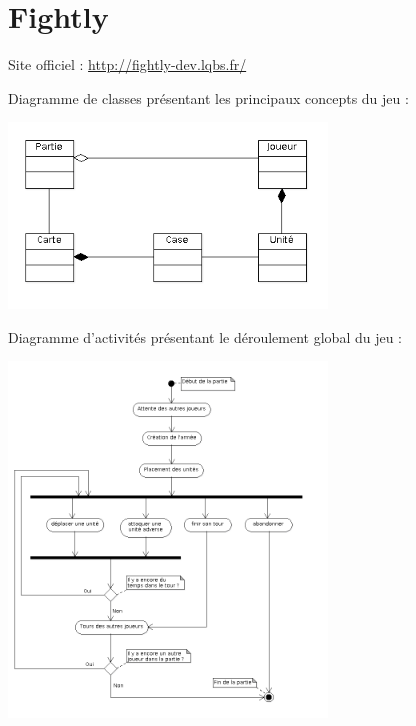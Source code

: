 \documentclass[a4paper,10pt]{report}
\begin{document}
	\section{Fightly}
	
    Site officiel : \url{http://fightly-dev.lqbs.fr/}

    Diagramme de classes présentant les principaux concepts du jeu : 
    
		\includegraphics[width=320px]{diagrammes/concept-fightly.png}

    Diagramme d'activités présentant le déroulement global du jeu : 
    
    \includegraphics[width=320px]{diagrammes/fightlyactivites.png}
    
\end{document}
